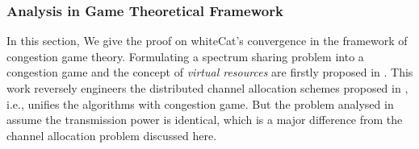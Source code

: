\documentclass[times]{ettauth}
\newcommand{\ie}{i.e., }
\theoremstyle{mytheoremstyle}
\theoremstyle{mytheoremstyle}
\theoremstyle{mytheoremstyle}
\begin{document}
\subsubsection{Analysis in Game Theoretical Framework}
\label{game}
In this section, We give the proof on whiteCat's convergence in the framework of congestion game theory.
Formulating a spectrum sharing problem into a congestion game and the concept of \textit{virtual resources} are firstly proposed in \cite{allerton08_liu}.
This work reversely engineers the distributed channel allocation schemes proposed in \cite{babadi_08, Ko_DistributedCA}, \ie unifies the algorithms with congestion game.
But the problem analysed in~\cite{allerton08_liu} assume the transmission power is identical, which is a major difference from the channel allocation problem discussed here. 
\end{document}
